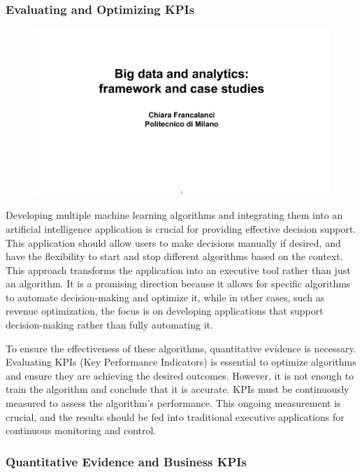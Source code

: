 \subsubsection{Evaluating and Optimizing KPIs}

\begin{figure}[!h]
    \centering
    \includegraphics[page=22, trim = 0cm 1.5cm 1.5cm 0.7cm, clip, width=\textwidth]{images/06 - BIG_DATA.pdf}
\end{figure}

Developing multiple machine learning algorithms and integrating them
into an artificial intelligence application is crucial for providing
effective decision support. This application should allow users to make
decisions manually if desired, and have the flexibility to start and
stop different algorithms based on the context. This approach transforms
the application into an executive tool rather than just an algorithm. It
is a promising direction because it allows for specific algorithms to
automate decision-making and optimize it, while in other cases, such as
revenue optimization, the focus is on developing applications that
support decision-making rather than fully automating it.

To ensure the effectiveness of these algorithms, quantitative evidence
is necessary. Evaluating KPIs (Key Performance Indicators) is essential
to optimize algorithms and ensure they are achieving the desired
outcomes. However, it is not enough to train the algorithm and conclude
that it is accurate. KPIs must be continuously measured to assess the
algorithm's performance. This ongoing measurement is crucial, and the
results should be fed into traditional executive applications for
continuous monitoring and control.

\subsubsection{Quantitative Evidence and Business KPIs}

